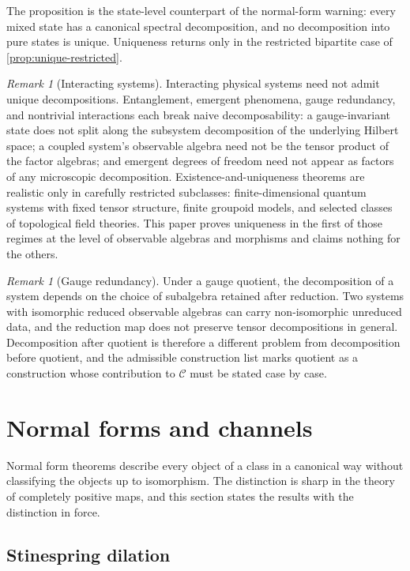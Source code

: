\documentclass[11pt,letterpaper]{article}
\theoremstyle{definition}
\theoremstyle{remark}
\newtheorem{remark}[theorem]{Remark}
\begin{document}
The proposition is the state-level counterpart of the normal-form warning: every mixed state has a canonical spectral decomposition, and no decomposition into pure states is unique. Uniqueness returns only in the restricted bipartite case of \cref{prop:unique-restricted}.

\begin{remark}[Interacting systems]
Interacting physical systems need not admit unique decompositions. Entanglement, emergent phenomena, gauge redundancy, and nontrivial interactions each break naive decomposability: a gauge-invariant state does not split along the subsystem decomposition of the underlying Hilbert space; a coupled system's observable algebra need not be the tensor product of the factor algebras; and emergent degrees of freedom need not appear as factors of any microscopic decomposition. Existence-and-uniqueness theorems are realistic only in carefully restricted subclasses: finite-dimensional quantum systems with fixed tensor structure, finite groupoid models, and selected classes of topological field theories. This paper proves uniqueness in the first of those regimes at the level of observable algebras and morphisms and claims nothing for the others.
\end{remark}

\begin{remark}[Gauge redundancy]
Under a gauge quotient, the decomposition of a system depends on the choice of subalgebra retained after reduction. Two systems with isomorphic reduced observable algebras can carry non-isomorphic unreduced data, and the reduction map does not preserve tensor decompositions in general. Decomposition after quotient is therefore a different problem from decomposition before quotient, and the admissible construction list marks quotient as a construction whose contribution to $\mathcal{C}$ must be stated case by case.
\end{remark}

\section{Normal forms and channels}
\label{sec:normal-forms}

Normal form theorems describe every object of a class in a canonical way without classifying the objects up to isomorphism. The distinction is sharp in the theory of completely positive maps, and this section states the results with the distinction in force.

\subsection{Stinespring dilation}
\end{document}
